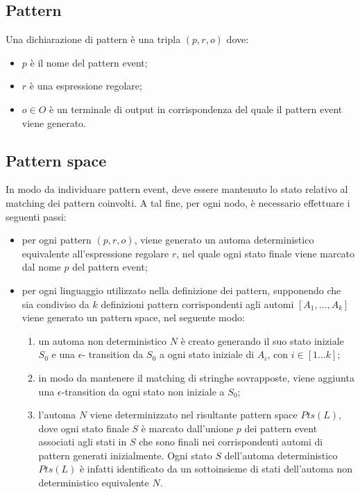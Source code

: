 \subsection{Pattern}
Una dichiarazione di pattern è una tripla $(p,r,o)$ dove:
\begin{itemize}
\item $p$ è il nome del pattern event;
\item $r$ è una espressione regolare;
\item $o \in O$ è un terminale di output in corrispondenza del quale il pattern event viene generato.
\end{itemize}

\subsection{Pattern space}
In modo da individuare pattern event, deve essere mantenuto lo stato relativo al matching dei pattern coinvolti. A tal fine, per ogni nodo, è necessario effettuare i seguenti passi:
\begin{itemize}
\item per ogni pattern $(p,r,o)$, viene generato un automa deterministico equivalente all'espressione regolare $r$, nel quale ogni stato finale viene marcato dal nome $p$ del pattern event;
\item per ogni linguaggio utilizzato nella definizione dei pattern, supponendo che sia condiviso da $k$ definizioni pattern corrispondenti agli automi $[A_1, \ldots , A_k]$ viene generato un pattern space, nel seguente modo:
	\begin{enumerate}
	\item un automa non deterministico $N$ è creato generando il suo stato iniziale $S_0$ e una $\epsilon$-			transition da $S_0$ a ogni stato iniziale di $A_i$, con $i \in [1 \ldots k]$;
	\item in modo da mantenere il matching di stringhe sovrapposte, viene aggiunta una $\epsilon$-transition
	da ogni stato non iniziale a $S_0$;
	\item l'automa $N$ viene determinizzato nel risultante pattern space $Pts(L)$, dove ogni stato finale $S$ è marcato dall'unione $p$ dei pattern event associati agli stati in $S$ che sono finali nei corrispondenti automi di pattern generati inizialmente. Ogni stato $S$ dell'automa deterministico $Pts(L)$ è infatti identificato da un sottoinsieme di stati dell'automa non deterministico equivalente $N$.
	\end{enumerate}
\end{itemize}

